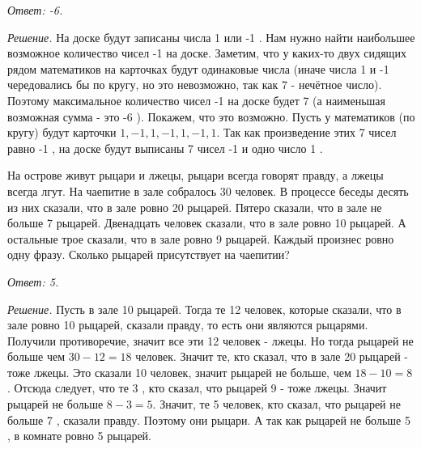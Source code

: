 \textit{Ответ: -6.}

\textit{Решение.}
На доске будут записаны числа 1 или -1 . Нам нужно найти наибольшее возможное количество чисел -1 на доске. Заметим, что у каких-то двух сидящих рядом математиков на карточках будут одинаковые числа (иначе числа 1 и -1 чередовались бы по кругу, но это невозможно, так как 7 - нечётное число). Поэтому максимальное количество чисел -1 на доске будет 7 (а наименьшая возможная сумма - это -6 ). Покажем, что это возможно. Пусть у математиков (по кругу) будут карточки $1,-1,1,- 1,1,-1,1$. Так как произведение этих 7 чисел равно -1 , на доске будут выписаны 7 чисел -1 и одно число 1 .

На острове живут рыцари и лжецы, рыцари всегда говорят правду, а лжецы всегда лгут. На чаепитие в зале собралось 30 человек. В процессе беседы десять из них сказали, что в зале ровно 20 рыцарей. Пятеро сказали, что в зале не больше 7 рыцарей. Двенадцать человек сказали, что в зале ровно 10 рыцарей. А остальные трое сказали, что в зале ровно 9 рыцарей. Каждый произнес ровно одну фразу. Сколько рыцарей присутствует на чаепитии?

\textit{Ответ: 5.}

\textit{Решение.}
Пусть в зале 10 рыцарей. Тогда те 12 человек, которые сказали, что в зале ровно 10 рыцарей, сказали правду, то есть они являются рыцарями. Получили противоречие, значит все эти 12 человек - лжецы. Но тогда рыцарей не больше чем $30- 12=18$ человек. Значит те, кто сказал, что в зале 20 рыцарей - тоже лжецы. Это сказали 10 человек, значит рыцарей не больше, чем $18-10=8$. Отсюда следует, что те 3 , кто сказал, что рыцарей 9 - тоже лжецы. Значит рыцарей не больше $8-3=5$. Значит, те 5 человек, кто сказал, что рыцарей не больше 7 , сказали правду. Поэтому они рыцари. А так как рыцарей не больше 5 , в комнате ровно 5 рыцарей.